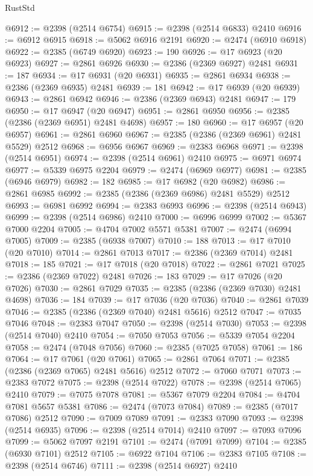 \begin{lexlean}{RustStd}
\begin{coremodule}
{\begin{coremodule}
{{{{{{{{{{{{{{{{{{{{{{{{{{{{{{{{{{{{{{{{{{{{{{{{{{@6912 := @2398 (@2514 @6754)
@6915 := @2398 (@2514 @6833) @2410
@6916 := @6912 @6915
@6918 := @5062 @6916 @2191
@6920 := @2474 (@6910 @6918)
@6922 := @2385 (@6749 @6920)
@6923 := 190
@6926 := @17 @6923 (@20 @6923)
@6927 := @2861 @6926
@6930 := @2386 (@2369 @6927) @2481
@6931 := 187
@6934 := @17 @6931 (@20 @6931)
@6935 := @2861 @6934
@6938 := @2386 (@2369 @6935) @2481
@6939 := 181
@6942 := @17 @6939 (@20 @6939)
@6943 := @2861 @6942
@6946 := @2386 (@2369 @6943) @2481
@6947 := 179
@6950 := @17 @6947 (@20 @6947)
@6951 := @2861 @6950
@6956 := @2385 (@2386 (@2369 @6951) @2481 @4698)
@6957 := 180
@6960 := @17 @6957 (@20 @6957)
@6961 := @2861 @6960
@6967 := @2385 (@2386 (@2369 @6961) @2481 @5529) @2512
@6968 := @6956 @6967
@6969 := @2383 @6968
@6971 := @2398 (@2514 @6951)
@6974 := @2398 (@2514 @6961) @2410
@6975 := @6971 @6974
@6977 := @5339 @6975 @2204
@6979 := @2474 (@6969 @6977)
@6981 := @2385 (@6946 @6979)
@6982 := 182
@6985 := @17 @6982 (@20 @6982)
@6986 := @2861 @6985
@6992 := @2385 (@2386 (@2369 @6986) @2481 @5529) @2512
@6993 := @6981 @6992
@6994 := @2383 @6993
@6996 := @2398 (@2514 @6943)
@6999 := @2398 (@2514 @6986) @2410
@7000 := @6996 @6999
@7002 := @5367 @7000 @2204
@7005 := @4704 @7002 @5571 @5381
@7007 := @2474 (@6994 @7005)
@7009 := @2385 (@6938 @7007)
@7010 := 188
@7013 := @17 @7010 (@20 @7010)
@7014 := @2861 @7013
@7017 := @2386 (@2369 @7014) @2481
@7018 := 185
@7021 := @17 @7018 (@20 @7018)
@7022 := @2861 @7021
@7025 := @2386 (@2369 @7022) @2481
@7026 := 183
@7029 := @17 @7026 (@20 @7026)
@7030 := @2861 @7029
@7035 := @2385 (@2386 (@2369 @7030) @2481 @4698)
@7036 := 184
@7039 := @17 @7036 (@20 @7036)
@7040 := @2861 @7039
@7046 := @2385 (@2386 (@2369 @7040) @2481 @5616) @2512
@7047 := @7035 @7046
@7048 := @2383 @7047
@7050 := @2398 (@2514 @7030)
@7053 := @2398 (@2514 @7040) @2410
@7054 := @7050 @7053
@7056 := @5339 @7054 @2204
@7058 := @2474 (@7048 @7056)
@7060 := @2385 (@7025 @7058)
@7061 := 186
@7064 := @17 @7061 (@20 @7061)
@7065 := @2861 @7064
@7071 := @2385 (@2386 (@2369 @7065) @2481 @5616) @2512
@7072 := @7060 @7071
@7073 := @2383 @7072
@7075 := @2398 (@2514 @7022)
@7078 := @2398 (@2514 @7065) @2410
@7079 := @7075 @7078
@7081 := @5367 @7079 @2204
@7084 := @4704 @7081 @5657 @5381
@7086 := @2474 (@7073 @7084)
@7089 := @2385 (@7017 @7086) @2512
@7090 := @7009 @7089
@7091 := @2383 @7090
@7093 := @2398 (@2514 @6935)
@7096 := @2398 (@2514 @7014) @2410
@7097 := @7093 @7096
@7099 := @5062 @7097 @2191
@7101 := @2474 (@7091 @7099)
@7104 := @2385 (@6930 @7101) @2512
@7105 := @6922 @7104
@7106 := @2383 @7105
@7108 := @2398 (@2514 @6746)
@7111 := @2398 (@2514 @6927) @2410
}}}}}}}}}}}}}}}}}}}}}}}}}}}}}}}}}}}}}}}}}}}}}}}}}}
\end{coremodule}}
\end{coremodule}
\end{lexlean}
